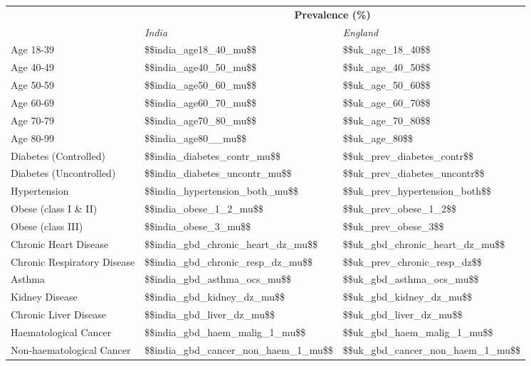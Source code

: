 \begin{tabular}{p{6cm}p{1.1cm}p{1cm}}
& \multicolumn{2}{c}{\textbf{Prevalence (\%)  }} \\[0.5ex] & \emph{India} & \emph{England} \\[2ex]
Age 18-39 & \num{$$india_age18_40_mu$$} & \num{$$uk_age_18_40$$} \\[0.25ex]
Age 40-49 & \num{$$india_age40_50_mu$$} & \num{$$uk_age_40_50$$} \\[0.25ex]
Age 50-59 & \num{$$india_age50_60_mu$$} & \num{$$uk_age_50_60$$}\\[0.25ex]
Age 60-69 & \num{$$india_age60_70_mu$$} & \num{$$uk_age_60_70$$}\\[0.25ex]
Age 70-79 & \num{$$india_age70_80_mu$$} & \num{$$uk_age_70_80$$}\\[0.25ex]
Age 80-99 & \num{$$india_age80__mu$$} & \num{$$uk_age_80$$} \\[0.25ex]
Diabetes (Controlled) & \num{$$india_diabetes_contr_mu$$} & \num{$$uk_prev_diabetes_contr$$} \\[0.25ex]
Diabetes (Uncontrolled) & \num{$$india_diabetes_uncontr_mu$$} & \num{$$uk_prev_diabetes_uncontr$$} \\[0.25ex]
Hypertension & \num{$$india_hypertension_both_mu$$} & \num{$$uk_prev_hypertension_both$$} \\[0.25ex]
Obese (class I \& II) & \num{$$india_obese_1_2_mu$$} & \num{$$uk_prev_obese_1_2$$} \\[0.25ex]
Obese (class III) & \num{$$india_obese_3_mu$$} & \num{$$uk_prev_obese_3$$} \\[0.25ex]
Chronic Heart Disease & \num{$$india_gbd_chronic_heart_dz_mu$$} & \num{$$uk_gbd_chronic_heart_dz_mu$$} \\[0.25ex]
Chronic Respiratory Disease & \num{$$india_gbd_chronic_resp_dz_mu$$} & \num{$$uk_prev_chronic_resp_dz$$} \\[0.25ex]
Asthma & \num{$$india_gbd_asthma_ocs_mu$$} & \num{$$uk_gbd_asthma_ocs_mu$$} \\[0.25ex]
Kidney Disease & \num{$$india_gbd_kidney_dz_mu$$} & \num{$$uk_gbd_kidney_dz_mu$$} \\[0.25ex]
Chronic Liver Disease & \num{$$india_gbd_liver_dz_mu$$} & \num{$$uk_gbd_liver_dz_mu$$} \\[0.25ex]
Haematological Cancer & \num{$$india_gbd_haem_malig_1_mu$$} & \num{$$uk_gbd_haem_malig_1_mu$$}\\[0.25ex]
Non-haematological Cancer & \num{$$india_gbd_cancer_non_haem_1_mu$$} & \num{$$uk_gbd_cancer_non_haem_1_mu$$} \\[0.25ex]

\end{tabular}
